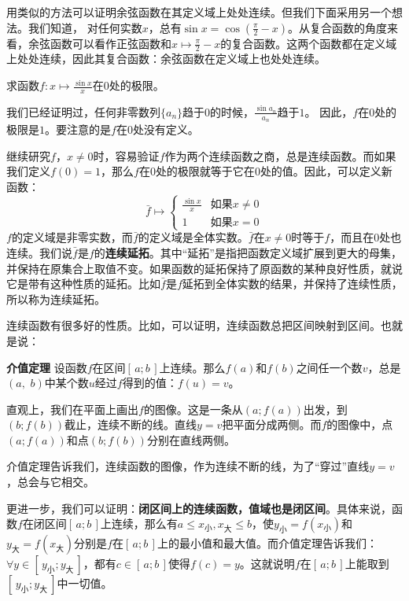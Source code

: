 \documentclass[12pt,UTF8,fontset=none]{ctexbook}
\begin{document}
用类似的方法可以证明余弦函数在其定义域上处处连续。但我们下面采用另一个想法。我们知道，
对任何实数$x$，总有$\sin{x} = \cos{\left(\frac{\pi}{2} - x\right)}$。从复合函数的角度来看，余弦函数可以看作正弦函数和$x\mapsto \frac{\pi}{2} - x$的复合函数。这两个函数都在定义域上处处连续，因此其复合函数：余弦函数在定义域上也处处连续。

\begin{et}
    求函数$f:x\mapsto \displaystyle\frac{\sin{x}}{x}$在$0$处的极限。
\end{et}
\begin{so}
    我们已经证明过，任何非零数列$\{a_n\}$趋于$0$的时候，$\displaystyle\frac{\sin{a_n}}{a_n}$趋于$1$。
    因此，$f$在$0$处的极限是$1$。要注意的是$f$在$0$处没有定义。
\end{so}

继续研究$f$，$x\neq 0$时，容易验证$f$作为两个连续函数之商，总是连续函数。而如果我们定义$f(0) = 1$，那么$f$在$0$处的极限就等于它在$0$处的值。因此，可以定义新函数：
$$
\bar{f}\mapsto \begin{cases}
    \displaystyle\frac{\sin{x}}{x} & \mbox{如果}x\neq 0 \\
    1 & \mbox{如果}x= 0
\end{cases}
$$
$f$的定义域是非零实数，而$\bar{f}$的定义域是全体实数。$\bar{f}$在$x\neq 0$时等于$f$，而且在$0$处也连续。我们说$\bar{f}$是$f$的\textbf{连续延拓}。其中“延拓”是指把函数定义域扩展到更大的母集，并保持在原集合上取值不变。如果函数的延拓保持了原函数的某种良好性质，就说它是带有这种性质的延拓。比如$\bar{f}$是$f$延拓到全体实数的结果，并保持了连续性质，所以称为连续延拓。

连续函数有很多好的性质。比如，可以证明，连续函数总把区间映射到区间。也就是说：
\begin{tm}{\textbf{介值定理}}
    设函数$f$在区间$[\,a;b\,]$上连续。那么$f(a)$和$f(b)$之间任一个数$v$，总是$(a, \,\,b)$中某个数$u$经过$f$得到的值：$f(u) = v$。
\end{tm}

直观上，我们在平面上画出$f$的图像。这是一条从$(a;f(a))$出发，到$(b;f(b))$截止，连续不断的线。直线$y = v$把平面分成两侧。而$f$的图像中，点$(a;f(a))$和点$(b;f(b))$分别在直线两侧。

介值定理告诉我们，连续函数的图像，作为连续不断的线，为了“穿过”直线$y = v$，总会与它相交。

更进一步，我们可以证明：\textbf{闭区间上的连续函数，值域也是闭区间}。具体来说，函数$f$在闭区间$[\,a;b\,]$上连续，那么有$a\leqslant x_{\text{小}} , x_{\text{大}} \leqslant b$，使$y_{\text{小}} = f(x_{\text{小}})$和$y_{\text{大}} = f(x_{\text{大}})$分别是$f$在$[\,a;b\,]$上的最小值和最大值。而介值定理告诉我们：$\forall y\in[\,y_{\text{小}};y_{\text{大}}\,]$，都有$c\in[\,a;b\,]$使得$f(c) = y$。这就说明$f$在$[\,a;b\,]$上能取到$[\,y_{\text{小}};y_{\text{大}}\,]$中一切值。
\end{document}
